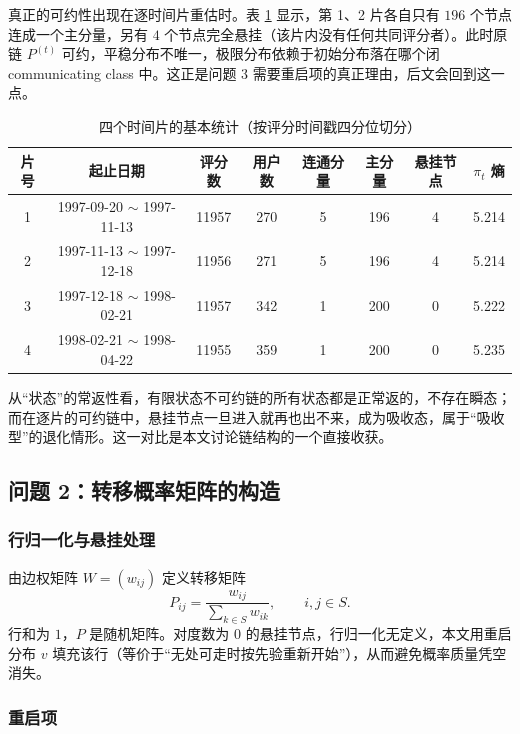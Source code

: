 \documentclass[12pt,a4paper]{ctexart}
\begin{document}
真正的可约性出现在逐时间片重估时。表 \ref{tab:slices} 显示，第 1、2 片各自只有 $196$ 个节点连成一个主分量，另有 $4$ 个节点完全悬挂（该片内没有任何共同评分者）。此时原链 $P^{(t)}$ 可约，平稳分布不唯一，极限分布依赖于初始分布落在哪个闭 communicating class 中。这正是问题 3 需要重启项的真正理由，后文会回到这一点。

\begin{table}[H]
\centering
\caption{四个时间片的基本统计（按评分时间戳四分位切分）}
\label{tab:slices}
\small
\begin{tabular}{cccccccc}
\toprule
片号 & 起止日期 & 评分数 & 用户数 & 连通分量 & 主分量 & 悬挂节点 & $\pi_t$ 熵 \\
\midrule
1 & 1997-09-20 $\sim$ 1997-11-13 & 11957 & 270 & 5 & 196 & 4 & 5.214 \\
2 & 1997-11-13 $\sim$ 1997-12-18 & 11956 & 271 & 5 & 196 & 4 & 5.214 \\
3 & 1997-12-18 $\sim$ 1998-02-21 & 11957 & 342 & 1 & 200 & 0 & 5.222 \\
4 & 1998-02-21 $\sim$ 1998-04-22 & 11955 & 359 & 1 & 200 & 0 & 5.235 \\
\bottomrule
\end{tabular}
\end{table}

从“状态”的常返性看，有限状态不可约链的所有状态都是正常返的，不存在瞬态；而在逐片的可约链中，悬挂节点一旦进入就再也出不来，成为吸收态，属于“吸收型”的退化情形。这一对比是本文讨论链结构的一个直接收获。

\subsection{问题 2：转移概率矩阵的构造}

\subsubsection{行归一化与悬挂处理}

由边权矩阵 $W=(w_{ij})$ 定义转移矩阵
\begin{equation}
P_{ij}=\frac{w_{ij}}{\sum_{k\in S}w_{ik}},\qquad i,j\in S .
\label{eq:P}
\end{equation}
行和为 $1$，$P$ 是随机矩阵。对度数为 $0$ 的悬挂节点，行归一化无定义，本文用重启分布 $v$ 填充该行（等价于“无处可走时按先验重新开始”），从而避免概率质量凭空消失。

\subsubsection{重启项}
\end{document}
